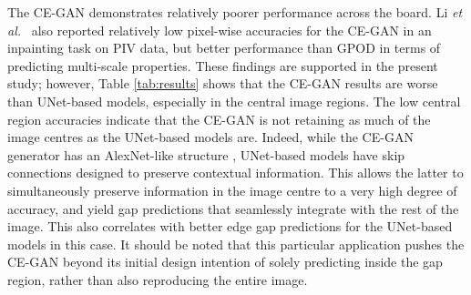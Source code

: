 \documentclass{article}
\begin{document}
The CE-GAN demonstrates relatively poorer performance across the board. Li \textit{et al.}~\cite{li2023multi} also reported relatively low pixel-wise accuracies for the CE-GAN in an inpainting task on PIV data, but better performance than GPOD in terms of predicting multi-scale properties. These findings are supported in the present study; however, Table \ref{tab:results} shows that the CE-GAN results are worse than UNet-based models, especially in the central image regions. The low central region accuracies indicate that the CE-GAN is not retaining as much of the image centres as the UNet-based models are. Indeed, while the CE-GAN generator has an AlexNet-like structure \cite{krizhevsky2012imagenet}, UNet-based models have skip connections designed to preserve contextual information. This allows the latter to simultaneously preserve information in the image centre to a very high degree of accuracy, and yield gap predictions that seamlessly integrate with the rest of the image. This also correlates with better edge gap predictions for the UNet-based models in this case. It should be noted that this particular application pushes the CE-GAN beyond its initial design intention of solely predicting inside the gap region, rather than also reproducing the entire image. 

\end{document}
